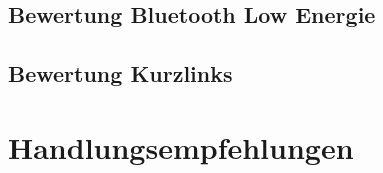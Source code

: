 
\subsection{Bewertung Bluetooth Low Energie} %
\label{sub:bewertung_bluetooth_low_energie}


\subsection{Bewertung Kurzlinks} %
\label{sub:bewertung_kurzlinks}



\newpage
\section{Handlungsempfehlungen} %
\label{sec:handlungsempfehlungen}

